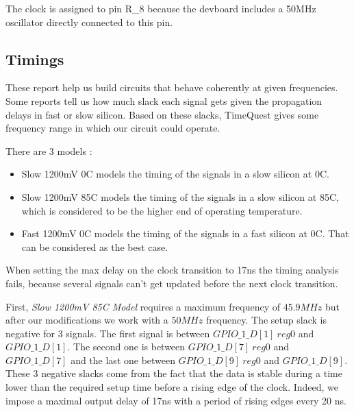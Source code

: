 \documentclass[12pt,a4paper,hyperlinks]{rapport_unif}
\begin{document}
The clock is assigned to pin R\_8 because the devboard includes a 50MHz oscillator directly connected to this pin.

\subsection{Timings}
These report help us build circuits that behave coherently at given frequencies. Some reports tell us how much slack each signal gets given the propagation delays in fast or slow silicon. Based on these slacks, TimeQuest gives some frequency range in which our circuit could operate.

There are 3 models :
\begin{itemize}
\item Slow 1200mV 0C models the timing of the signals in a slow silicon at 0C.
\item Slow 1200mV 85C models the timing of the signals in a slow silicon at 85C, which is considered to be the higher end of operating temperature.
\item Fast 1200mV 0C models the timing of the signals in a fast silicon at 0C. That can be considered as the best case.
\end{itemize}

When setting the max delay on the clock transition to 17ns the timing analysis fails, because several signals can't get updated before the next clock transition. 

First, \emph{Slow 1200mV 85C Model} requires a maximum frequency of $45.9 MHz$ but after our modifications we work with a $50MHz$ frequency. The setup slack is negative for 3 signals. The first signal is between $GPIO\_1\_D[1]~reg0$ and $GPIO\_1\_D[1]$. The second one is between $GPIO\_1\_D[7]~reg0$ and $GPIO\_1\_D[7]$ and the last one between $GPIO\_1\_D[9]~reg0$ and $GPIO\_1\_D[9]$. These 3 negative slacks come from the fact that the data is stable during a time lower than the required setup time before a rising edge of the clock. Indeed, we impose a maximal output delay of 17ns with a period of rising edges every 20 ns.
\end{document}
